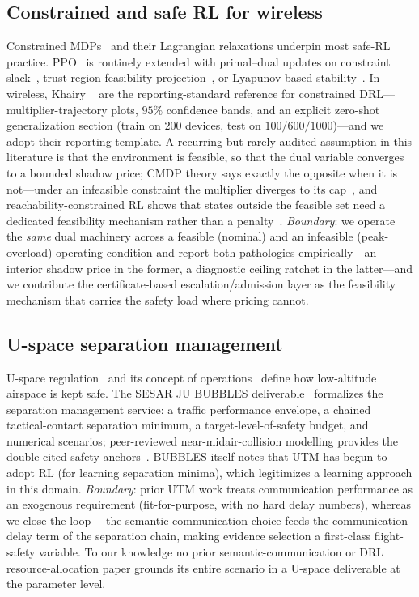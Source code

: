 \subsection{Constrained and safe RL for wireless}
Constrained MDPs~\cite{altman1999constrained} and their Lagrangian
relaxations underpin most safe-RL practice. PPO~\cite{schulman2017ppo} is
routinely extended with primal--dual updates on constraint
slack~\cite{tessler2019rcpo}, trust-region feasibility
projection~\cite{achiam2017cpo}, or Lyapunov-based
stability~\cite{chow2018lyapunov,neely2010stochastic}. In wireless, Khairy
\etal~\cite{khairy2021constrained} are the reporting-standard reference for
constrained DRL---multiplier-trajectory plots, $95\%$ confidence bands, and
an explicit zero-shot generalization section (train on $200$ devices, test
on $100/600/1000$)---and we adopt their reporting template. A recurring but
rarely-audited assumption in this literature is that the environment is
feasible, so that the dual variable converges to a bounded shadow price;
CMDP theory says exactly the opposite when it is not---under an infeasible
constraint the multiplier diverges to its
cap~\cite{altman1999constrained,chow2017risk}, and
reachability-constrained RL shows that states outside the feasible set need
a dedicated feasibility mechanism rather than a
penalty~\cite{yu2022reachability}. \emph{Boundary}: we operate the
\emph{same} dual machinery across a feasible (nominal) and an infeasible
(peak-overload) operating condition and report both pathologies
empirically---an interior shadow price in the former, a diagnostic ceiling
ratchet in the latter---and we contribute the certificate-based
escalation/admission layer as the feasibility mechanism that carries the
safety load where pricing cannot.

\subsection{U-space separation management}
U-space regulation~\cite{eu2021664} and its concept of
operations~\cite{corus2019conops,jarus2019sora,icao2005doc9854} define how
low-altitude airspace is kept safe. The SESAR JU BUBBLES
deliverable~\cite{bubbles2022d21} formalizes the separation management
service: a traffic performance envelope, a chained tactical-contact
separation minimum, a target-level-of-safety budget, and numerical
scenarios; peer-reviewed near-midair-collision modelling provides the
double-cited safety anchors~\cite{weinert2022well}. BUBBLES itself notes
that UTM has begun to adopt RL (for learning separation minima), which
legitimizes a learning approach in this domain. \emph{Boundary}: prior UTM
work treats communication performance as an exogenous requirement
(fit-for-purpose, with no hard delay numbers), whereas we close the loop---
the semantic-communication choice feeds the communication-delay term of the
separation chain, making evidence selection a first-class flight-safety
variable. To our knowledge no prior semantic-communication or DRL
resource-allocation paper grounds its entire scenario in a U-space
deliverable at the parameter level.
